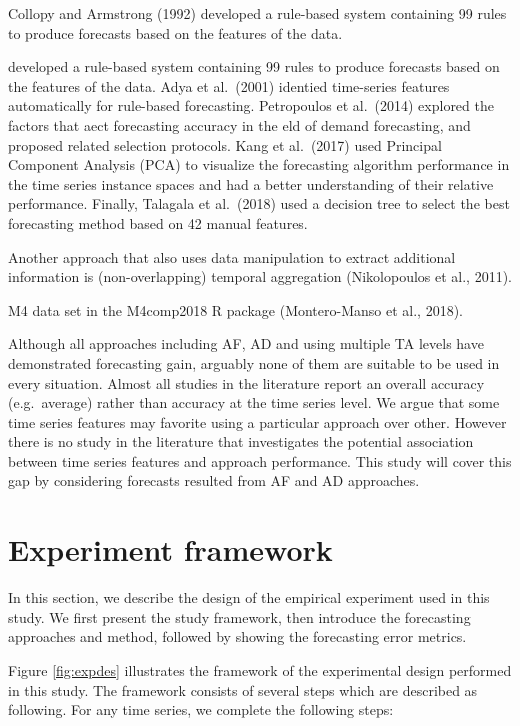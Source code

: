 \documentclass[]{elsarticle} %
\begin{document}
Collopy and Armstrong (1992) developed a rule-based system containing 99
rules to produce forecasts based on the features of the data.

developed a rule-based system containing 99 rules to produce forecasts
based on the features of the data. Adya et al.~(2001) identied
time-series features automatically for rule-based forecasting.
Petropoulos et al.~(2014) explored the factors that aect forecasting
accuracy in the eld of demand forecasting, and proposed related
selection protocols. Kang et al.~(2017) used Principal Component
Analysis (PCA) to visualize the forecasting algorithm performance in the
time series instance spaces and had a better understanding of their
relative performance. Finally, Talagala et al.~(2018) used a decision
tree to select the best forecasting method based on 42 manual features.

Another approach that also uses data manipulation to extract additional
information is (non-overlapping) temporal aggregation (Nikolopoulos et
al., 2011).

M4 data set in the M4comp2018 R package (Montero-Manso et al., 2018).

Although all approaches including AF, AD and using multiple TA levels
have demonstrated forecasting gain, arguably none of them are suitable
to be used in every situation. Almost all studies in the literature
report an overall accuracy (e.g.~average) rather than accuracy at the
time series level. We argue that some time series features may favorite
using a particular approach over other. However there is no study in the
literature that investigates the potential association between time
series features and approach performance. This study will cover this gap
by considering forecasts resulted from AF and AD approaches.

\hypertarget{framework}{%
\section{Experiment framework}\label{framework}}

In this section, we describe the design of the empirical experiment used
in this study. We first present the study framework, then introduce the
forecasting approaches and method, followed by showing the forecasting
error metrics.

Figure \ref{fig:expdes} illustrates the framework of the experimental
design performed in this study. The framework consists of several steps
which are described as following. For any time series, we complete the
following steps:
\end{document}
